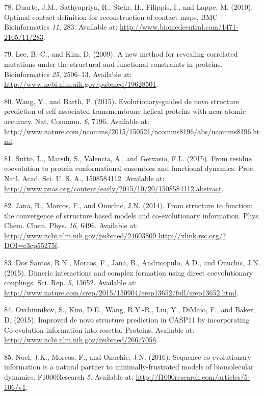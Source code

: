 \documentclass[12pt,a4paper,twoside]{book}
\theoremstyle{definition}
\theoremstyle{definition}
\theoremstyle{remark}
\begin{document}
\hypertarget{ref-Duarte2010}{}
78. Duarte, J.M., Sathyapriya, R., Stehr, H., Filippis, I., and Lappe,
M. (2010). Optimal contact definition for reconstruction of contact
maps. BMC Bioinformatics \emph{11}, 283. Available at:
\url{http://www.biomedcentral.com/1471-2105/11/283}.

\hypertarget{ref-Lee2009}{}
79. Lee, B.-C., and Kim, D. (2009). A new method for revealing
correlated mutations under the structural and functional constraints in
proteins. Bioinformatics \emph{25}, 2506--13. Available at:
\url{http://www.ncbi.nlm.nih.gov/pubmed/19628501}.

\hypertarget{ref-Wang2015}{}
80. Wang, Y., and Barth, P. (2015). Evolutionary-guided de novo
structure prediction of self-associated transmembrane helical proteins
with near-atomic accuracy. Nat. Commun. \emph{6}, 7196. Available at:
\url{http://www.nature.com/ncomms/2015/150521/ncomms8196/abs/ncomms8196.html}.

\hypertarget{ref-Sutto2015}{}
81. Sutto, L., Marsili, S., Valencia, A., and Gervasio, F.L. (2015).
From residue coevolution to protein conformational ensembles and
functional dynamics. Proc. Natl. Acad. Sci. U. S. A., 1508584112.
Available at:
\url{http://www.pnas.org/content/early/2015/10/20/1508584112.abstract}.

\hypertarget{ref-Jana2014}{}
82. Jana, B., Morcos, F., and Onuchic, J.N. (2014). From structure to
function: the convergence of structure based models and co-evolutionary
information. Phys. Chem. Chem. Phys. \emph{16}, 6496. Available at:
\href{http://www.ncbi.nlm.nih.gov/pubmed/24603809\%20http://xlink.rsc.org/?DOI=c3cp55275f}{http://www.ncbi.nlm.nih.gov/pubmed/24603809 http://xlink.rsc.org/?DOI=c3cp55275f}.

\hypertarget{ref-DosSantos2015a}{}
83. Dos Santos, R.N., Morcos, F., Jana, B., Andricopulo, A.D., and
Onuchic, J.N. (2015). Dimeric interactions and complex formation using
direct coevolutionary couplings. Sci. Rep. \emph{5}, 13652. Available
at:
\url{http://www.nature.com/srep/2015/150904/srep13652/full/srep13652.html}.

\hypertarget{ref-Ovchinnikov2015b}{}
84. Ovchinnikov, S., Kim, D.E., Wang, R.Y.-R., Liu, Y., DiMaio, F., and
Baker, D. (2015). Improved de novo structure prediction in CASP11 by
incorporating Co-evolution information into rosetta. Proteins. Available
at: \url{http://www.ncbi.nlm.nih.gov/pubmed/26677056}.

\hypertarget{ref-Noel2016}{}
85. Noel, J.K., Morcos, F., and Onuchic, J.N. (2016). Sequence
co-evolutionary information is a natural partner to minimally-frustrated
models of biomolecular dynamics. F1000Research \emph{5}. Available at:
\url{http://f1000research.com/articles/5-106/v1}.
\end{document}
